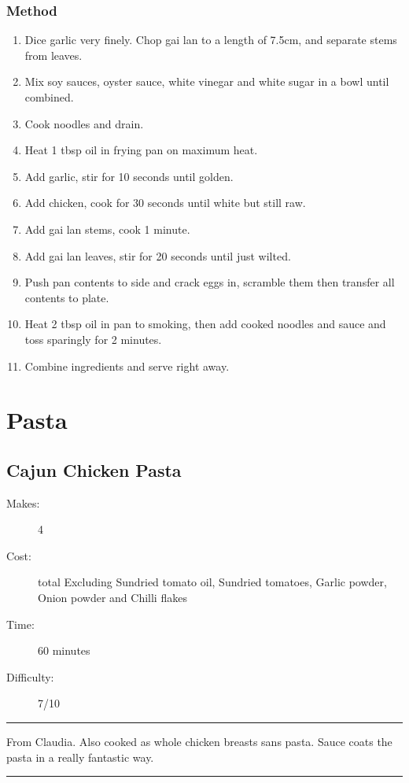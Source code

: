 \documentclass[]{article}
\begin{document}
\subsubsection*{\Large Method}
\begin{enumerate}[font=\huge\color{accent}]
	\item Dice garlic very finely. Chop gai lan to a length of 7.5cm, and separate stems from leaves.
	\item Mix soy sauces, oyster sauce, white vinegar and white sugar in a bowl until combined.
	\item Cook noodles and drain.
	\item Heat 1 tbsp oil in frying pan on maximum heat.
	\item Add garlic, stir for 10 seconds until golden.
	\item Add chicken, cook for 30 seconds until white but still raw.
	\item Add gai lan stems, cook 1 minute.
	\item Add gai lan leaves, stir for 20 seconds until just wilted.
	\item Push pan contents to side and crack eggs in, scramble them then transfer all contents to plate.
	\item Heat 2 tbsp oil in pan to smoking, then add cooked noodles and sauce and toss sparingly for 2 minutes.
	\item Combine ingredients and serve right away.
\end{enumerate}
\newpage
{}
\section*{\center\Huge\color{accent}Pasta}
\label{cat:Pasta}
\label{rec:Cajun Chicken Pasta}
\subsection*{\center\huge Cajun Chicken Pasta}
\begin{description}
\item[Makes:] 4 
\item[Cost:]  total Excluding Sundried tomato oil, Sundried tomatoes, Garlic powder, Onion powder and Chilli flakes
\item[Time:] 60 minutes
\item[Difficulty:] 7/10
\end{description}
\vspace{0.2cm}\hrule\vspace{0.5cm}
\begin{adjustwidth}{0.5 cm}{0.5 cm}

From Claudia. Also cooked as whole chicken breasts sans pasta. Sauce coats the pasta in a really fantastic way. \hfill\color{accent}{\Large\faTruck\hspace{0.1cm}}\color{black}

\end{adjustwidth}
\vspace{0.5cm}\hrule
\end{document}
